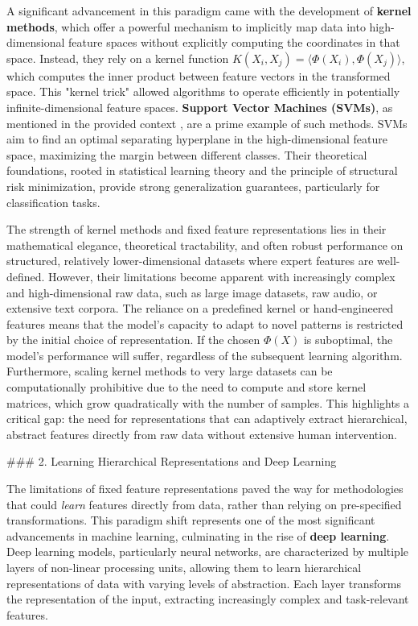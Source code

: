\documentclass{article}
\begin{document}
A significant advancement in this paradigm came with the development of \textbf{kernel methods}, which offer a powerful mechanism to implicitly map data into high-dimensional feature spaces without explicitly computing the coordinates in that space. Instead, they rely on a kernel function $K(X_i, X_j) = \langle \Phi(X_i), \Phi(X_j) \rangle$, which computes the inner product between feature vectors in the transformed space. This "kernel trick" allowed algorithms to operate efficiently in potentially infinite-dimensional feature spaces. \textbf{Support Vector Machines (SVMs)}, as mentioned in the provided context \cite{3}, are a prime example of such methods. SVMs aim to find an optimal separating hyperplane in the high-dimensional feature space, maximizing the margin between different classes. Their theoretical foundations, rooted in statistical learning theory and the principle of structural risk minimization, provide strong generalization guarantees, particularly for classification tasks.

The strength of kernel methods and fixed feature representations lies in their mathematical elegance, theoretical tractability, and often robust performance on structured, relatively lower-dimensional datasets where expert features are well-defined. However, their limitations become apparent with increasingly complex and high-dimensional raw data, such as large image datasets, raw audio, or extensive text corpora. The reliance on a predefined kernel or hand-engineered features means that the model's capacity to adapt to novel patterns is restricted by the initial choice of representation. If the chosen $\Phi(X)$ is suboptimal, the model's performance will suffer, regardless of the subsequent learning algorithm. Furthermore, scaling kernel methods to very large datasets can be computationally prohibitive due to the need to compute and store kernel matrices, which grow quadratically with the number of samples. This highlights a critical gap: the need for representations that can adaptively extract hierarchical, abstract features directly from raw data without extensive human intervention.

\#\#\# 2. Learning Hierarchical Representations and Deep Learning

The limitations of fixed feature representations paved the way for methodologies that could \textit{learn} features directly from data, rather than relying on pre-specified transformations. This paradigm shift represents one of the most significant advancements in machine learning, culminating in the rise of \textbf{deep learning}. Deep learning models, particularly neural networks, are characterized by multiple layers of non-linear processing units, allowing them to learn hierarchical representations of data with varying levels of abstraction. Each layer transforms the representation of the input, extracting increasingly complex and task-relevant features.
\end{document}
